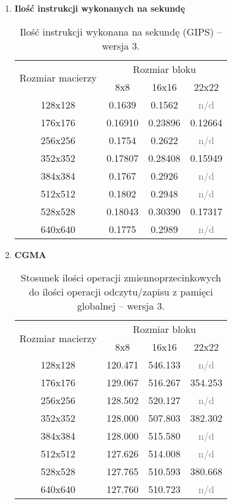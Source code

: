 \begin{enumerate}
\item \textbf{Ilość instrukcji wykonanych na sekundę} \newline

\begin{table}[H]
\centering
\begin{tabular}{|c|c|c|c|}
\hline
\multirow{2}{*}{Rozmiar macierzy} & \multicolumn{3}{c|}{Rozmiar bloku} \\ \cline{2-4}
& 8x8 & 16x16 & 22x22 \\ \hline
128x128 & 0.1639 & 0.1562 & \textcolor{gray}{n/d}\\ \hline
176x176 & 0.16910 & 0.23896 & 0.12664 \\ \hline
256x256 & 0.1754 & 0.2622 & \textcolor{gray}{n/d} \\ \hline
352x352 & 0.17807 & 0.28408 & 0.15949 \\ \hline
384x384 & 0.1767 & 0.2926 & \textcolor{gray}{n/d} \\ \hline
512x512 & 0.1802 & 0.2948 & \textcolor{gray}{n/d} \\ \hline
528x528 & 0.18043 & 0.30390 & 0.17317 \\ \hline
640x640 & 0.1775 & 0.2989 & \textcolor{gray}{n/d} \\ \hline
\end{tabular}
\caption{Ilość instrukcji wykonana na sekundę (GIPS) -- wersja 3.}
\end{table}

\item \textbf{CGMA} \newline

\begin{table}[H]
\centering
\begin{tabular}{|c|c|c|c|}
\hline
\multirow{2}{*}{Rozmiar macierzy} & \multicolumn{3}{c|}{Rozmiar bloku} \\ \cline{2-4}
& 8x8 & 16x16 & 22x22 \\ \hline
128x128 & 120.471 & 546.133 & \textcolor{gray}{n/d} \\ \hline
176x176 & 129.067 & 516.267 & 354.253 \\ \hline
256x256 & 128.502 & 520.127 & \textcolor{gray}{n/d} \\ \hline
352x352 & 128.000 & 507.803 & 382.302 \\ \hline
384x384 & 128.000 & 515.580 & \textcolor{gray}{n/d} \\ \hline
512x512 & 127.626 & 514.008 & \textcolor{gray}{n/d} \\ \hline
528x528 & 127.765 & 510.593 & 380.668 \\ \hline
640x640 & 127.760 & 510.723 & \textcolor{gray}{n/d} \\ \hline
\end{tabular}
\caption{Stosunek ilości operacji zmiennoprzecinkowych do ilości operacji odczytu/zapisu z pamięci globalnej -- wersja 3.}
\end{table}

\end{enumerate}
